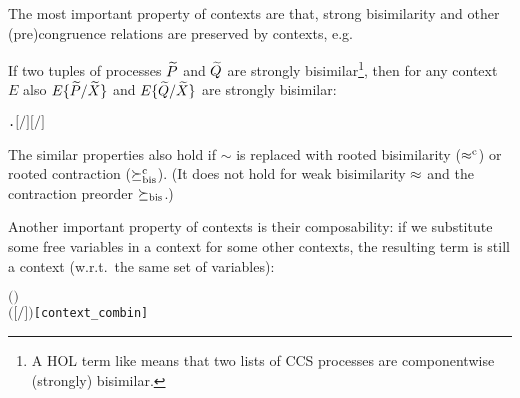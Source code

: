 The most important property of contexts are that, strong bisimilarity
and other (pre)congruence relations are preserved by contexts, e.g.
\begin{lemma}
If two tuples of processes $\widetilde P$ and $\widetilde Q$ are strongly
bisimilar\footnote{A HOL term like 
  means that two lists of CCS processes are componentwise
  (strongly) bisimilar.}, then
for any context $E$
also $E\{\widetilde P/\widetilde X\}$ and
$E\{\widetilde Q/\widetilde X\}$ are strongly bisimilar:
\begin{alltt}
\HOLTokenTurnstile{}   \HOLSymConst{\HOLTokenConj{}}   \HOLSymConst{\ensuremath{=}}   \HOLSymConst{\HOLTokenConj{}}  \HOLSymConst{\HOLTokenStrongEQ}  \HOLSymConst{\HOLTokenImp{}}
   \HOLSymConst{\HOLTokenForall{}}.    \HOLSymConst{\HOLTokenImp{}} \ensuremath{[}\ensuremath{/}\ensuremath{]}  \HOLSymConst{\HOLTokenStrongEQ} \ensuremath{[}\ensuremath{/}\ensuremath{]} 
\end{alltt}
\end{lemma}
The similar properties also hold if $\sim$ is replaced with rooted
bisimilarity ($\mathrel{\approx^{\rm{c}}}$) or rooted contraction ($\mathrel{\succeq^{\rm{c}}_{\rm{bis}}}$). (It does
not hold for weak bisimilarity $\approx$ and the contraction preorder $\mathrel{\succeq_{\rm{bis}}}$.)

Another important property of contexts is their composability: if we
substitute some free variables in a context for some other contexts, the
resulting term is still a context (w.r.t.~the same set of variables):
\begin{alltt}
\HOLTokenTurnstile{}   \HOLSymConst{\HOLTokenConj{}}    \HOLSymConst{\HOLTokenConj{}}  \ensuremath{(} \ensuremath{)}  \HOLSymConst{\HOLTokenConj{}}
     \HOLSymConst{\ensuremath{=}}   \HOLSymConst{\HOLTokenImp{}}
     \ensuremath{(}\ensuremath{[}\ensuremath{/}\ensuremath{]} \ensuremath{)}\hfill{[context_combin]}
\end{alltt}

